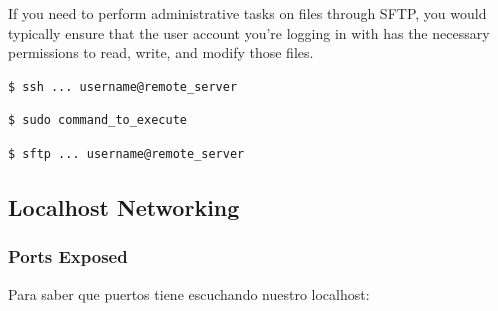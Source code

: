 \documentclass{article}
\newenvironment{codetemplate}[1][]{%
  \mybasecolorbox[#1]
  \itshape
}{%
  \endmybasecolorbox
}
\begin{document}
If you need to perform administrative tasks on files through SFTP, you would typically ensure that the user account you're logging in with has the necessary permissions to read, write, and modify those files. 

\begin{codetemplate}{}
\begin{verbatim}
$ ssh ... username@remote_server
\end{verbatim}
\end{codetemplate}

\begin{codetemplate}{}
\begin{verbatim}
$ sudo command_to_execute
\end{verbatim}
\end{codetemplate}

\begin{codetemplate}{}
\begin{verbatim}
$ sftp ... username@remote_server
\end{verbatim}
\end{codetemplate}

\subsection{Localhost Networking}
\subsubsection{Ports Exposed}

Para saber que puertos tiene escuchando nuestro localhost:
\end{document}
